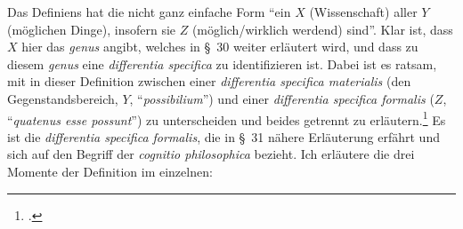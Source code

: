 Das Definiens hat die nicht ganz einfache Form \enquote{ein $X$
(Wissenschaft) aller $Y$ (möglichen Dinge), insofern sie $Z$
(möglich/wirklich werdend) sind}. Klar ist, dass $X$ hier das \emph{genus}
angibt, welches in \S~30 weiter erläutert wird, und dass zu diesem \emph{genus}
eine \emph{differentia specifica} zu identifizieren ist.
Dabei ist es ratsam, mit
in dieser Definition zwischen einer \emph{differentia specifica
materialis} (den Gegenstandsbereich, $Y$, \enquote{\emph{possibilium}}) und
einer \emph{differentia specifica formalis} ($Z$, \enquote{\emph{quatenus esse
possunt}}) zu unterscheiden und beides getrennt zu
erläutern.\footnote{\cite[Vgl.][\S~29]{Stiebritz:ErlaeuterungenderVernuenftigenGedanckenvondenKraefftendesmenschlichenVerstandesWolffs1977}.}
Es ist die \emph{differentia specifica formalis}, die in \S~31 nähere
Erläuterung erfährt und sich auf den Begriff der \emph{cognitio philosophica}
bezieht. Ich erläutere die drei Momente der Definition im einzelnen:

